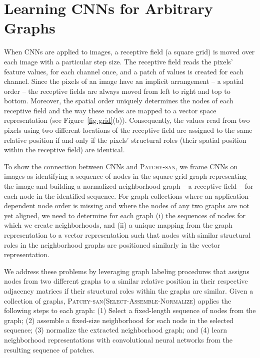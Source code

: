 \documentclass{article}
\newcommand{\patchysan}{{\textsc{Patchy-san}}\xspace}
\begin{document}
\section{Learning CNNs for Arbitrary Graphs}


When CNNs are applied to images, a receptive field (a square grid) is moved over each image with a particular step size. The receptive field reads the pixels' feature values,  for each channel once, and a patch of values is created for each channel. 
Since the pixels of an image have an implicit arrangement -- a spatial order -- the receptive fields are always moved from left to right and top to bottom. Moreover, the spatial order uniquely determines the nodes of each receptive field and the way these nodes are mapped to a vector space representation (see Figure~\ref{fig-grid}(b)). Consequently, the values read from two pixels using two different locations of the receptive field are assigned to the same relative position if and only if the pixels' structural roles (their spatial position within the receptive field) are identical.

To show the connection between CNNs and \patchysan, we frame CNNs on images as identifying a sequence of nodes in the square grid graph representing the image and building a normalized neighborhood graph -- a receptive field -- for each node in the identified sequence.
For graph collections where an application-dependent node order is missing and where the nodes of any two graphs are not yet aligned, we need to determine for each graph (i) the sequences of nodes for which we create neighborhoods, and (ii) a unique mapping from the graph representation to a vector representation such that nodes with similar structural roles in the neighborhood graphs are positioned similarly in the vector representation. 

We address these problems by leveraging graph labeling procedures that assigns nodes from two different graphs to a similar relative position in their respective adjacency matrices if their structural roles within the graphs are similar. Given a collection of graphs, \patchysan (\textsc{Select}-\textsc{Assemble}-\textsc{Normalize}) applies the following steps to each graph: (1) Select a fixed-length sequence of nodes from the graph; (2) assemble a fixed-size neighborhood for each node in the selected sequence; (3) normalize the extracted  neighborhood graph; and (4) learn neighborhood representations with convolutional neural networks from the resulting sequence of patches.  
\end{document}

